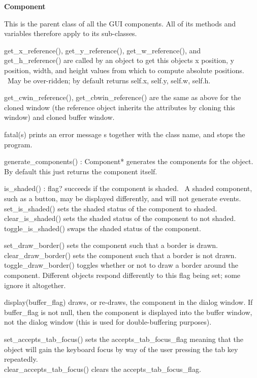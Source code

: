 {\sffamily\bfseries
{}Component}

This is the parent class of all the GUI components. All of its methods
and variables therefore apply to its sub-classes.

get\_x\_reference(), get\_y\_reference(), get\_w\_reference(), and
get\_h\_reference() are called by an object to get this
object{\textquotesingle}s x position, y position, width, and height
values from which to compute absolute positions. \ May be over-ridden;
by default returns self.x, self.y, self.w, self.h.

get\_cwin\_reference(), get\_cbwin\_reference() are the same as above
for the cloned window (the reference object inherits the attributes by
cloning this window) and cloned buffer window.

fatal(s) prints an error message s together with the class name, and
stops the program.

generate\_components() : Component* generates the components for the
object. By default this just returns the component itself.

is\_shaded() : flag? succeeds if the component is shaded. \ A shaded
component, such as a button, may be displayed differently, and will not
generate events.\\
set\_is\_shaded() sets the shaded status of the component to
shaded.\\
clear\_is\_shaded() sets the shaded status of the component to not
shaded.\\
toggle\_is\_shaded() swaps the shaded status of the component.

set\_draw\_border() sets the component such that a border is
drawn.\\
clear\_draw\_border() sets the component such that a border is not
drawn.\\
toggle\_draw\_border() toggles whether or not to draw a border around
the component. Different objects respond differently to this flag being
set; some ignore it altogether.

display(buffer\_flag) draws, or re-draws, the component in the dialog
window. If buffer\_flag is not null, then the component is displayed
into the buffer window, not the dialog window (this is used for
double-buffering purposes).

set\_accepts\_tab\_focus() sets the accepts\_tab\_focus\_flag meaning
that the object will gain the keyboard focus by way of the user
pressing the tab key repeatedly.\\
clear\_accepts\_tab\_focus() clears the accepts\_tab\_focus\_flag.


